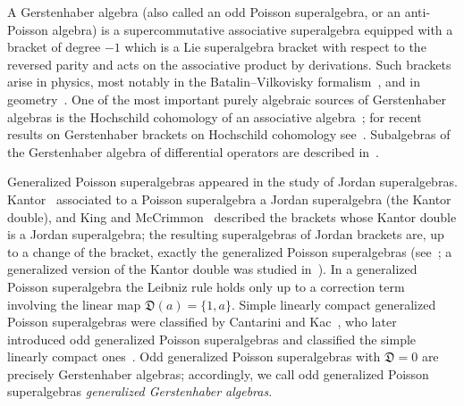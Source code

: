 \documentclass[11pt,reqno]{amsart}
\newcommand{\D}{\mathfrak D}
\theoremstyle{plain}
\theoremstyle{definition}
\theoremstyle{remark}
\begin{document}
A Gerstenhaber algebra (also called an odd Poisson superalgebra, or an anti-Poisson algebra) is a supercommutative associative superalgebra equipped with a bracket of degree $-1$ which is a Lie superalgebra bracket with respect to the reversed parity and acts on the associative product by derivations.
Such brackets arise in physics, most notably in the Batalin--Vilkovisky formalism~\cite{BV81,p1,p2}, and in geometry~\cite{p3}.
One of the most important purely algebraic sources of Gerstenhaber algebras is the Hochschild cohomology of an associative algebra~\cite{Ger63}; for recent results on Gerstenhaber brackets on Hochschild cohomology see~\cite{W21,V16,V19,L21}.
Subalgebras of the Gerstenhaber algebra of differential operators are described in~\cite{B06}.

Generalized Poisson superalgebras appeared in the study of Jordan superalgebras.
Kantor~\cite{Kan90,Kan92} associated to a Poisson superalgebra a Jordan superalgebra (the Kantor double), and King and McCrimmon~\cite{KM92} described the brackets whose Kantor double is a Jordan superalgebra; the resulting superalgebras of Jordan brackets are, up to a change of the bracket, exactly the generalized Poisson superalgebras (see~\cite{CK07,K17}; a generalized version of the Kantor double was studied in~\cite{K10}).
In a generalized Poisson superalgebra the Leibniz rule holds only up to a correction term involving the linear map $\D(a)=\{1,a\}$.
Simple linearly compact generalized Poisson superalgebras were classified by Cantarini and Kac~\cite{CK07}, who later introduced odd generalized Poisson superalgebras and classified the simple linearly compact ones~\cite{CK10}.
Odd generalized Poisson superalgebras with $\D=0$ are precisely Gerstenhaber algebras; accordingly, we call odd generalized Poisson superalgebras \emph{generalized Gerstenhaber algebras}.
\end{document}
